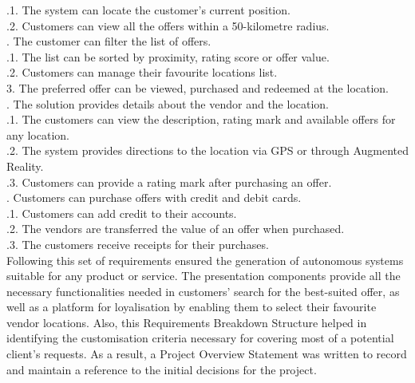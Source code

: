 \indent{}.1. The system can locate the customer's current position.\\
\indent{}.2. Customers can view all the offers within a 50-kilometre radius.\\
. The customer can filter the list of offers.\\
\indent{}.1. The list can be sorted by proximity, rating score or offer value.\\
\indent{}.2. Customers can manage their favourite locations list.\\
3. The preferred offer can be viewed, purchased and redeemed at the location.\\
. The solution provides details about the vendor and the location.\\
\indent{}.1. The customers can view the description, rating mark and available offers for any location.\\
\indent{}.2. The system provides directions to the location via GPS or through Augmented Reality.\\
\indent{}.3. Customers can provide a rating mark after purchasing an offer.\\
. Customers can purchase offers with credit and debit cards.\\
\indent{}.1. Customers can add credit to their accounts.\\
\indent{}.2. The vendors are transferred the value of an offer when purchased.\\
\indent{}.3. The customers receive receipts for their purchases.\\

Following this set of requirements ensured the generation of autonomous systems suitable for any product or service. The presentation components provide all the necessary functionalities needed in customers' search for the best-suited offer, as well as a platform for loyalisation by enabling them to select their favourite vendor locations. Also, this Requirements Breakdown Structure helped in identifying the customisation criteria necessary for covering most of a potential client's requests. As a result, a Project Overview Statement was written to record and maintain a reference to the initial decisions for the project.\\

